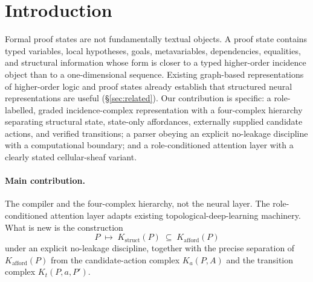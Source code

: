 \documentclass[11pt]{article}
\theoremstyle{definition}
\theoremstyle{plain}
\newcommand{\Kstruct}{K_{\mathrm{struct}}}
\newcommand{\Kafford}{K_{\mathrm{afford}}}
\begin{document}
\begin{abstract}
learnable role-conditioned transport as load-bearing components; a parameter-matched control (typed hyperedges with the same three role-conditioned attention directions as M5) ties with the strong hyperedge baseline and remains $1.90$~pp below M5 ($p < 10^{-3}$), demonstrating that the cellular \emph{grading itself} is the additional load-bearing ingredient. M5 ($\Kafford$) and M5a ($\Kstruct$) are statistically tied on this benchmark; affordance cells are motivated here by leakage discipline (Condition~\ref{cond:noleak}) rather than by a measured expressivity gain. To our knowledge, this specific role-labelled incidence-complex representation, with its four-complex hierarchy, leakage-aware compiler, and role-conditioned incidence-transport layer for Lean-style proof search, has not been developed previously.
\end{abstract}

\section{Introduction}

Formal proof states are not fundamentally textual objects. A proof state contains typed variables, local hypotheses, goals, metavariables, dependencies, equalities, and structural information whose form is closer to a typed higher-order incidence object than to a one-dimensional sequence. Existing graph-based representations of higher-order logic and proof states already establish that structured neural representations are useful (\S\ref{sec:related}). Our contribution is specific: a role-labelled, graded incidence-complex representation with a four-complex hierarchy separating structural state, state-only affordances, externally supplied candidate actions, and verified transitions; a parser obeying an explicit no-leakage discipline with a computational boundary; and a role-conditioned attention layer with a clearly stated cellular-sheaf variant.

\paragraph{Main contribution.} The compiler and the four-complex hierarchy, not the neural layer. The role-conditioned attention layer adapts existing topological-deep-learning machinery. What is new is the construction
\[
P \;\longmapsto\; \Kstruct(P) \;\subseteq\; \Kafford(P)
\]
under an explicit no-leakage discipline, together with the precise separation of $\Kafford(P)$ from the candidate-action complex $K_a(P,A)$ and the transition complex $K_t(P,a,P')$.
\end{document}

